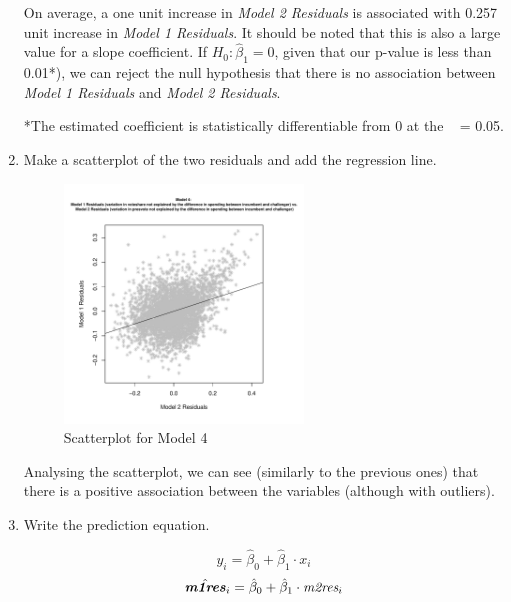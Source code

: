 \documentclass[12pt,letterpaper]{article}
\begin{document}
\begin{enumerate}
On average, a one unit increase in \textit{Model 2 Residuals} is associated with 0.257 unit increase in \textit{Model 1 Residuals}. It should be noted that this is also a large value for a slope coefficient. If \(H_0: \hat{\beta}_1 = 0\), given that our p-value is less than 0.01*), we can reject the null hypothesis that there is no association between \textit{Model 1 Residuals} and \textit{Model 2 Residuals}. 

*The estimated coefficient is statistically differentiable from 0 at the \alpha \  = 0.05.

		\item Make a scatterplot of the two residuals and add the regression line. 

			 
		
			\begin{figure}[H]
			\centering
			\includegraphics[width=0.6\textwidth]{04.PS03_Skrypnyk_Plot4.pdf}
			\caption{Scatterplot for Model 4}
			\label{fig:Plot4}
		\end{figure}
		
Analysing the scatterplot, we can see (similarly to the previous ones) that there is a positive association between the variables (although with outliers).  

\newpage

		\item Write the prediction equation.
		
	\begin{center}
	
	\[
	\hat{y_i} = \hat{\beta}_0 + \hat{\beta}_1 \cdot x_i
	\]
	\[\hat{\textbf{\textit{m1res}}}_i  = \hat{\beta}_0 + \hat{\beta}_1 \cdot  \textit{m2res}_i
	\]
\end{center}


\end{enumerate}
\end{document}
